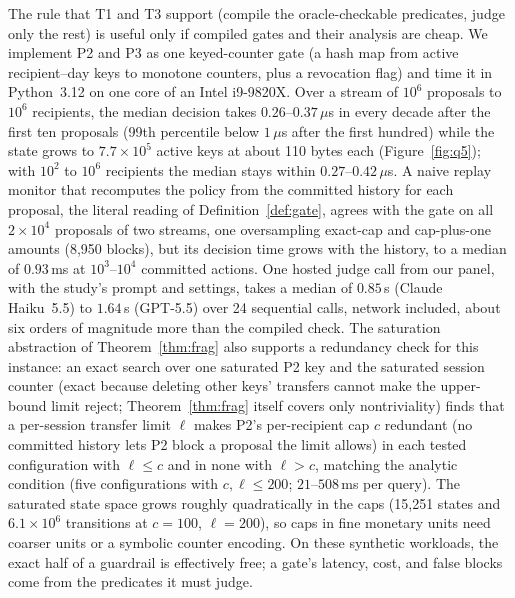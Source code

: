 The rule that T1 and T3 support (compile the oracle-checkable predicates, judge only
the rest) is useful only if compiled gates and their analysis are cheap. We implement
P2 and P3 as one keyed-counter gate (a hash map from active recipient--day keys to
monotone counters, plus a revocation flag) and time it in Python~3.12 on one core of an
Intel i9-9820X. Over a stream of $10^6$ proposals to $10^6$ recipients, the median
decision takes $0.26$--$0.37\,\mu$s in every decade after the first ten proposals (99th
percentile below $1\,\mu$s after the first hundred) while the state grows to
$7.7{\times}10^5$ active keys at about 110 bytes each (Figure~\ref{fig:q5}); with $10^2$
to $10^6$ recipients the median stays within $0.27$--$0.42\,\mu$s. A naive replay
monitor that recomputes the policy from the committed history for each proposal, the
literal reading of Definition~\ref{def:gate}, agrees with the gate on all
$2{\times}10^4$ proposals of two streams, one oversampling exact-cap and cap-plus-one
amounts (8,950 blocks), but its decision time grows with the history, to a median of
$0.93$\,ms at $10^3$--$10^4$ committed actions. One hosted judge call from our panel,
with the study's prompt and settings, takes a median of $0.85$\,s (Claude Haiku~5.5)
to $1.64$\,s (GPT-5.5) over 24 sequential calls, network included, about six orders
of magnitude more than the compiled check. The saturation abstraction of
Theorem~\ref{thm:frag} also supports a redundancy check for this instance: an exact
search over one saturated P2 key and the saturated session counter (exact because
deleting other keys' transfers cannot make the upper-bound limit reject;
Theorem~\ref{thm:frag} itself covers only nontriviality) finds that a per-session transfer limit $\ell$ makes P2's per-recipient cap $c$ redundant (no committed history lets
P2 block a proposal the limit allows) in each tested configuration with $\ell\le c$ and in
none with $\ell>c$, matching the analytic condition (five configurations with $c,\ell\le200$;
$21$--$508$\,ms per query). The saturated state space grows roughly
quadratically in the caps (15,251 states and $6.1{\times}10^6$ transitions at $c=100$,
$\ell=200$), so caps in fine monetary units need coarser units or a symbolic counter
encoding. On these synthetic workloads, the exact half of a guardrail is effectively
free; a gate's latency, cost, and false blocks come from the predicates it must judge.
